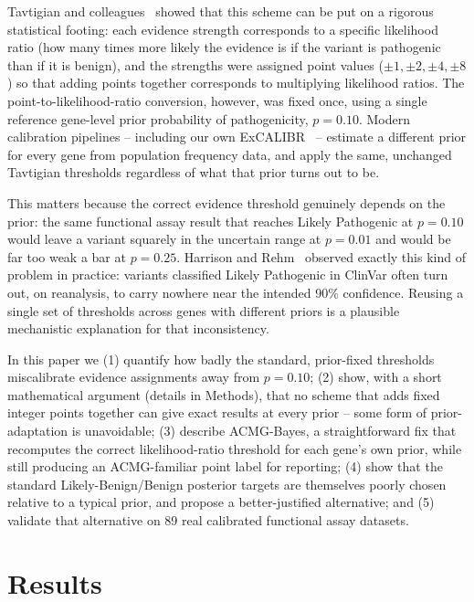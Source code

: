 \documentclass[11pt]{article}
\newcommand{\excalibr}{ExCALIBR\xspace}
\begin{document}
Tavtigian and colleagues~\cite{tavtigian2018modeling, Tavtigian2020} showed
that this scheme can be put on a rigorous statistical footing: each evidence
strength corresponds to a specific likelihood ratio (how many times more
likely the evidence is if the variant is pathogenic than if it is benign),
and the strengths were assigned point values ($\pm1, \pm2, \pm4, \pm8$) so
that adding points together corresponds to multiplying likelihood ratios.
The point-to-likelihood-ratio conversion, however, was fixed once, using a
single reference gene-level prior probability of pathogenicity,
$p = 0.10$. Modern calibration pipelines -- including our own
\excalibr~\cite{igvf_pp} -- estimate a different prior for every gene from
population frequency data, and apply the same, unchanged
Tavtigian thresholds regardless of what that prior turns out to be.

This matters because the correct evidence threshold genuinely depends on
the prior: the same functional assay result that reaches Likely Pathogenic
at $p=0.10$ would leave a variant squarely in the uncertain range at
$p=0.01$ and would be far too weak a bar at $p=0.25$. Harrison and
Rehm~\cite{Harrison2019} observed exactly this kind of problem in practice:
variants classified Likely Pathogenic in ClinVar often turn out, on
reanalysis, to carry nowhere near the intended 90\% confidence. Reusing a
single set of thresholds across genes with different priors is a plausible
mechanistic explanation for that inconsistency.

In this paper we (1) quantify how badly the standard, prior-fixed
thresholds miscalibrate evidence assignments away from $p=0.10$; (2) show,
with a short mathematical argument (details in Methods), that no scheme
that adds fixed integer points together can give exact results at every
prior -- some form of prior-adaptation is unavoidable; (3) describe
ACMG-Bayes, a straightforward fix that recomputes the correct
likelihood-ratio threshold for each gene's own prior, while still
producing an ACMG-familiar point label for reporting; (4) show that the
standard Likely-Benign/Benign posterior targets are themselves poorly
chosen relative to a typical prior, and propose a better-justified
alternative; and (5) validate that alternative on 89 real calibrated
functional assay datasets.

\section*{Results}
\end{document}
